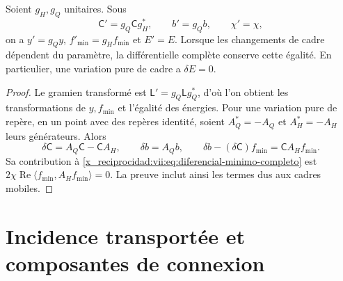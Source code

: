 \begin{proposition}
\label{x_reciprocidad:vii:prop:covariancia-minimo}
Soient \(g_H,g_Q\) unitaires. Sous
\[
 \mathsf C'=g_Q\mathsf C g_H^*,\qquad b'=g_Qb,\qquad \chi'=\chi,
\]
on a \(y'=g_Qy\), \(f'_{\min}=g_Hf_{\min}\) et \(E'=E\).
Lorsque les changements de cadre dépendent du paramètre, la différentielle
complète conserve cette égalité. En particulier, une variation pure de
cadre a \(\delta E=0\).
\end{proposition}

\begin{proof}
Le gramien transformé est \(\mathsf L'=g_Q\mathsf Lg_Q^*\),
d'où l'on obtient les transformations de \(y,f_{\min}\) et
l'égalité des énergies. Pour une variation pure de repère, en un point
avec des repères identité, soient \(A_Q^*=-A_Q\) et \(A_H^*=-A_H\)
leurs générateurs. Alors
\[
 \delta\mathsf C=A_Q\mathsf C-\mathsf C A_H,\qquad
 \delta b=A_Qb,\qquad
 \delta b-(\delta\mathsf C)f_{\min}=\mathsf C A_Hf_{\min}.
\]
Sa contribution à \eqref{x_reciprocidad:vii:eq:diferencial-minimo-completo} est
\(2\chi\operatorname{Re}\langle f_{\min},A_Hf_{\min}\rangle=0\).
La preuve inclut ainsi les termes dus aux cadres mobiles.
\end{proof}

\section{Incidence transportée et composantes de connexion}
\label{x_reciprocidad:vii:subsec:incidencia-conexion-minima}

